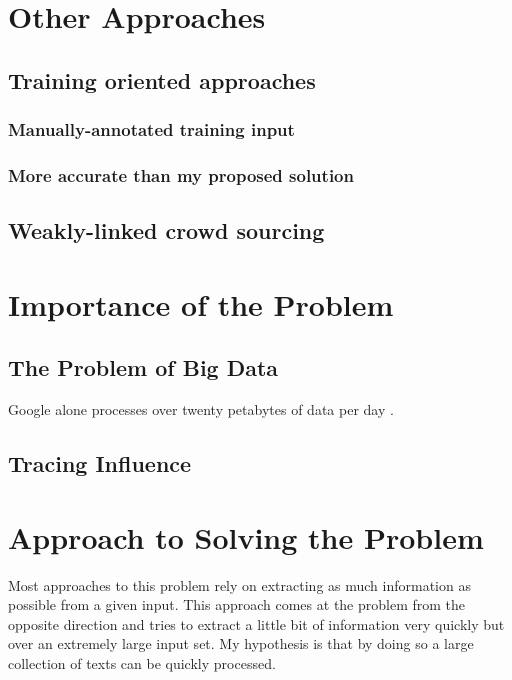 \documentclass[11pt]{article}
\begin{document}
\section{Other Approaches}

\subsection{Training oriented approaches}

\subsubsection{Manually-annotated training input}

\subsubsection{More accurate than my proposed solution}

\subsection{Weakly-linked crowd sourcing}

\section{Importance of the Problem}

\subsection{The Problem of Big Data}

Google alone processes over twenty petabytes of data per day \citep{Dean:2008:MSD:1327452.1327492}.

\subsection{Tracing Influence}


\section{Approach to Solving the Problem}

Most approaches to this problem rely on extracting as much information as possible from a given input.  This approach comes at the problem from the opposite direction and tries to extract a little bit of information very quickly but over an extremely large input set.  My hypothesis is that by doing so a large collection of texts can be quickly processed.  
\end{document}
